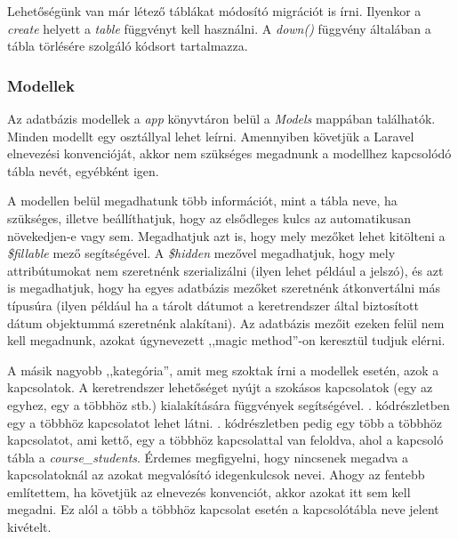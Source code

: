 \documentclass[
]{thesis-ekf}
\theoremstyle{definition}
\theoremstyle{remark}
\begin{document}
Lehetőségünk van már létező táblákat módosító migrációt is írni. Ilyenkor a \emph{create} helyett a \emph{table} függvényt kell használni. A \emph{down()} függvény általában a tábla törlésére szolgáló kódsort tartalmazza.

\subsubsection{Modellek}

Az adatbázis modellek a \emph{app} könyvtáron belül a \emph{Models} mappában találhatók. Minden modellt egy osztállyal lehet leírni. Amennyiben követjük a Laravel elnevezési konvencióját\cite{tableNames}, akkor nem szükséges megadnunk a modellhez kapcsolódó tábla nevét, egyébként igen.

A modellen belül megadhatunk több információt, mint a tábla neve, ha szükséges, illetve beállíthatjuk, hogy az elsődleges kulcs az automatikusan növekedjen-e vagy sem. Megadhatjuk azt is, hogy mely mezőket lehet kitölteni a \emph{\$fillable} mező segítségével. A \emph{\$hidden} mezővel megadhatjuk, hogy mely attribútumokat nem szeretnénk szerializálni (ilyen lehet például a jelszó), és azt is megadhatjuk, hogy ha egyes adatbázis mezőket szeretnénk átkonvertálni más típusúra (ilyen például ha a tárolt dátumot a keretrendszer által biztosított dátum objektummá szeretnénk alakítani). Az adatbázis mezőit ezeken felül nem kell megadnunk, azokat úgynevezett ,,magic method''-on\cite{magicMethod} keresztül tudjuk elérni.

A másik nagyobb ,,kategória'', amit meg szoktak írni a modellek esetén, azok a kapcsolatok. A keretrendszer lehetőséget nyújt a szokásos kapcsolatok (egy az egyhez, egy a többhöz stb.) kialakítására függvények segítségével. . kódrészletben egy a többhöz kapcsolatot lehet látni. . kódrészletben pedig egy több a többhöz kapcsolatot, ami kettő, egy a többhöz kapcsolattal van feloldva, ahol a kapcsoló tábla a \emph{course\_students}. Érdemes megfigyelni, hogy nincsenek megadva a kapcsolatoknál az azokat megvalósító idegenkulcsok nevei. Ahogy az fentebb említettem, ha követjük az elnevezés konvenciót, akkor azokat itt sem kell megadni. Ez alól a több a többhöz kapcsolat esetén a kapcsolótábla neve jelent kivételt.



\end{document}

